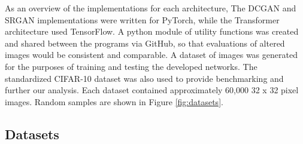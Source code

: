 \documentclass[letterpaper]{article} %
\begin{document}
As an overview of the implementations for each architecture,
The DCGAN and SRGAN implementations were written for PyTorch,
while the Transformer architecture used TensorFlow.
A python module of utility functions was created and shared between the programs via GitHub,
so that evaluations of altered images would be consistent and comparable.
A dataset of images was generated
for the purposes of training and testing the developed networks.
The standardized CIFAR-10 dataset
was also used to provide benchmarking and further our analysis.
Each dataset contained approximately 60,000 32 x 32 pixel images.
Random samples are shown in Figure \ref{fig:datasets}.

\subsection{Datasets}
\end{document}
